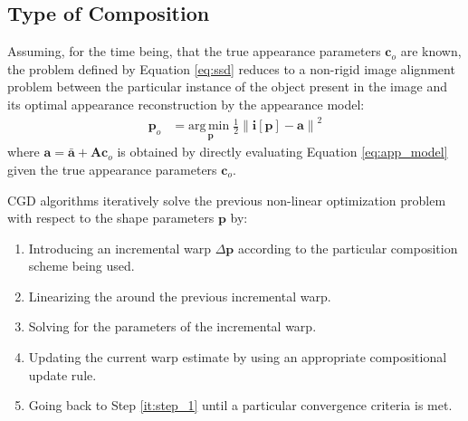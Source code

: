 \subsection{Type of Composition}
\label{sec:composition}

Assuming, for the time being, that the true appearance parameters $\mathbf{c}_o$ are known, the problem defined by Equation \ref{eq:ssd} reduces to a non-rigid image alignment problem \cite{Baker2004, Munoz2014} between the particular instance of the object present in the image and its optimal appearance reconstruction by the appearance model:
\begin{equation}
    \begin{aligned}
        \mathbf{p}_o & = \underset{\mathbf{p}}{\mathrm{arg\,min\;}} 
        \frac{1}{2}\left\| \mathbf{i}[\mathbf{p}] - \mathbf{a} \right\|^2 
    \label{eq:ssd_shape}
    \end{aligned}
\end{equation}
where $\mathbf{a} = \bar{\mathbf{a}} + \mathbf{A} \mathbf{c}_o$ is obtained by directly evaluating Equation \ref{eq:app_model} given the true appearance parameters $\mathbf{c}_o$.

CGD algorithms iteratively solve the previous non-linear optimization problem with respect to the shape parameters $\mathbf{p}$ by:
\begin{enumerate}
    \item Introducing an incremental warp $\Delta\mathbf{p}$ according to the particular composition scheme being used.
    \label{it:step_1}
    
    \item Linearizing the around the previous incremental warp.
    \label{it:step_2}
    
    \item Solving for the parameters of the incremental warp.
    \label{it:step_3}

    \item Updating the current warp estimate by using an appropriate compositional update rule.
    \label{it:step_4}

    \item Going back to Step \ref{it:step_1} until a particular convergence criteria is met.
    \label{it:step_5}
\end{enumerate}


